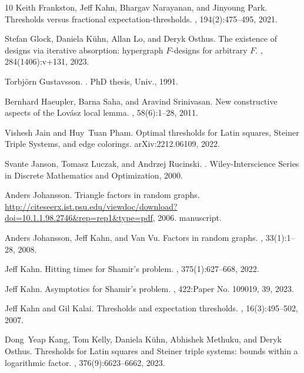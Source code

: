 \documentclass[11pt]{article}
\numberwithin{equation}{section}
\newcounter{i}
\theoremstyle{plain}
\theoremstyle{plain} %
\theoremstyle{definition}
\begin{document}
\begin{thebibliography}{10}
Keith Frankston, Jeff Kahn, Bhargav Narayanan, and Jinyoung Park.
\newblock Thresholds versus fractional expectation-thresholds.
, 194(2):475--495, 2021.

Stefan Glock, Daniela K\"{u}hn, Allan Lo, and Deryk Osthus.
\newblock The existence of designs via iterative absorption: hypergraph
  {$F$}-designs for arbitrary {$F$}.
, 284(1406):v+131, 2023.

Torbj{\"o}rn Gustavsson.
.
\newblock PhD thesis, Univ., 1991.

Bernhard Haeupler, Barna Saha, and Aravind Srinivasan.
\newblock New constructive aspects of the {L}ov{\'a}sz local lemma.
, 58(6):1--28, 2011.

Vishesh Jain and Huy~Tuan Pham.
\newblock Optimal thresholds for {L}atin squares, {S}teiner {T}riple {S}ystems,
  and edge colorings.
\newblock arXiv:2212.06109, 2022.

Svante Janson, Tomasz Luczak, and Andrzej Rucinski.
.
\newblock Wiley-Interscience Series in Discrete Mathematics and Optimization,
  2000.

Anders Johansson.
\newblock Triangle factors in random graphs.
\newblock
  \url{http://citeseerx.ist.psu.edu/viewdoc/download?doi=10.1.1.98.2746&rep=rep1&type=pdf},
  2006.
\newblock manuscript.

Anders Johansson, Jeff Kahn, and Van Vu.
\newblock Factors in random graphs.
, 33(1):1--28, 2008.

Jeff Kahn.
\newblock Hitting times for {S}hamir's problem.
, 375(1):627--668, 2022.

Jeff Kahn.
\newblock Asymptotics for {S}hamir's problem.
, 422:Paper No. 109019, 39, 2023.

Jeff Kahn and Gil Kalai.
\newblock Thresholds and expectation thresholds.
, 16(3):495--502, 2007.

Dong~Yeap Kang, Tom Kelly, Daniela K\"{u}hn, Abhishek Methuku, and Deryk
  Osthus.
\newblock Thresholds for {L}atin squares and {S}teiner triple systems: bounds
  within a logarithmic factor.
, 376(9):6623--6662, 2023.


\end{thebibliography}
\end{document}
